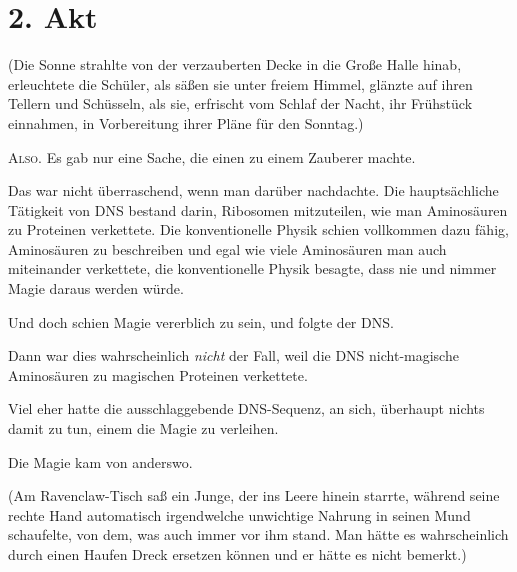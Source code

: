\section{2. Akt}
(Die Sonne strahlte von der verzauberten Decke in die Große Halle hinab, erleuchtete die Schüler, als säßen sie unter freiem Himmel, glänzte auf ihren Tellern und Schüsseln, als sie, erfrischt vom Schlaf der Nacht, ihr Frühstück einnahmen, in Vorbereitung ihrer Pläne für den Sonntag.)

\lettrine{A}{lso.} Es gab nur eine Sache, die einen zu einem Zauberer machte.

Das war nicht überraschend, wenn man darüber nachdachte. Die hauptsächliche Tätigkeit von DNS bestand darin, Ribosomen mitzuteilen, wie man Aminosäuren zu Proteinen verkettete. Die konventionelle Physik schien vollkommen dazu fähig, Aminosäuren zu beschreiben und egal wie viele Aminosäuren man auch miteinander verkettete, die konventionelle Physik besagte, dass nie und nimmer Magie daraus werden würde.

Und doch schien Magie vererblich zu sein, und folgte der DNS.

Dann war dies wahrscheinlich \emph{nicht} der Fall, weil die DNS nicht-magische Aminosäuren zu magischen Proteinen verkettete.

Viel eher hatte die ausschlaggebende DNS-Sequenz, an sich, überhaupt nichts damit zu tun, einem die Magie zu verleihen.

Die Magie kam von anderswo.

(Am Ravenclaw-Tisch saß ein Junge, der ins Leere hinein starrte, während seine rechte Hand automatisch irgendwelche unwichtige Nahrung in seinen Mund schaufelte, von dem, was auch immer vor ihm stand. Man hätte es wahrscheinlich durch einen Haufen Dreck ersetzen können und er hätte es nicht bemerkt.)

